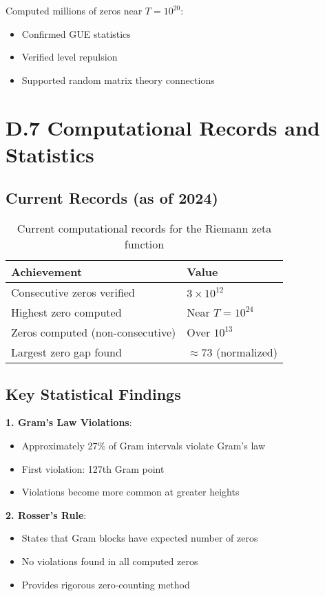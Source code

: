 Computed millions of zeros near $T = 10^{20}$:
\begin{itemize}
\item Confirmed GUE statistics
\item Verified level repulsion
\item Supported random matrix theory connections
\end{itemize}

\section{D.7 Computational Records and Statistics}

\subsection{Current Records (as of 2024)}

\begin{table}[h]
\centering
\begin{tabular}{|l|l|}
\hline
\textbf{Achievement} & \textbf{Value} \\
\hline
Consecutive zeros verified & $3 \times 10^{12}$ \\
Highest zero computed & Near $T = 10^{24}$ \\
Zeros computed (non-consecutive) & Over $10^{13}$ \\
Largest zero gap found & $\approx 73$ (normalized) \\
\hline
\end{tabular}
\caption{Current computational records for the Riemann zeta function}
\end{table}

\subsection{Key Statistical Findings}

\textbf{1. Gram's Law Violations}:
\begin{itemize}
\item Approximately 27\% of Gram intervals violate Gram's law
\item First violation: 127th Gram point
\item Violations become more common at greater heights
\end{itemize}

\textbf{2. Rosser's Rule}:
\begin{itemize}
\item States that Gram blocks have expected number of zeros
\item No violations found in all computed zeros
\item Provides rigorous zero-counting method
\end{itemize}

